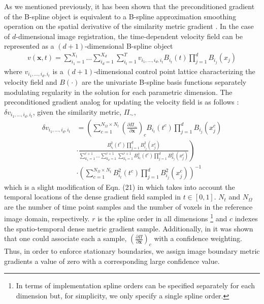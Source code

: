 \documentclass{frontiersSCNS}
\begin{document}
As we mentioned previously, it has been shown that the preconditioned
gradient of the B-spline object is equivalent to a B-spline approximation
smoothing operation on the spatial derivative of the similarity metric
gradient \citep{tustison2009}. In the case of
$d$-dimensional image registration, the time-dependent velocity field can be
represented
as a $(d + 1)$-dimensional B-spline object
\begin{align}
v(\mathbf{x}, t) = \sum_{i_1=1}^{X_1}\ldots\sum_{i_d=1}^{X_d}\sum_{i_t=1}^T v_{i_1,\ldots,i_d,i_t} B_{i_t}(t) \prod_{j=1}^d B_{i_j}(x_j)
\end{align}
where $v_{i_1,\ldots,i_d,i_t}$ is a $(d+1)$-dimensional control point lattice
characterizing the velocity field and $B(\cdot)$ are the univariate B-spline
basis functions separately modulating regularity in the solution for each parametric dimension.  The preconditioned gradient analog for updating the velocity
field is as follows \citep{tustison2012}:
$\delta v_{i_1,\ldots,i_d,i_t}$, given the similarity metric, $\Pi_\sim$,
\begin{align}
\label{eq:dmffd}
  \delta v_{i_1,\ldots,i_d,i_t} &= \left( \sum_{c=1}^{N_{\Omega} \times N_t} \left( \frac{\partial \Pi_\sim}{\partial \mathbf{x}} \right)_c B_{i_t}(t^c)\prod_{j=1}^d B_{i_j}(x_j^c)  \right. \nonumber \\
  &\cdot \left. \frac{B_{i_t}^2(t^c) \prod_{j=1}^d B_{i_j}^2 (x_j^c)}
  {\sum_{k_1=1}^{r+1}\ldots\sum_{k_d=1}^{r+1} \sum_{k_t=1}^{r+1} B_{k_t}^2(t^c)
  \prod_{j=1}^d B_{k_j}^2 (x_j^c)} \right) \nonumber \\
  &\cdot\left({\sum_{c=1}^{N_{\Omega}\times N_t}B_{i_t}^2(t^c) \prod_{j=1}^d B_{i_j}^2 (x_j^c)} \right) ^{-1}
\end{align}
which is a slight modification of Eqn. (21) in \cite{tustison2009}
which takes into account the temporal locations of the
dense gradient field sampled in $t \in [0,1]$. $N_t$ and $N_\Omega$ are the number
of time point samples and the number of voxels in the reference image domain, respectively.
$r$ is the spline order in all dimensions%
\footnote{
In terms of implementation spline orders can be specified separately for each dimension but, for simplicity,
we only specify a single spline order.
}
and $c$ indexes the spatio-temporal dense metric gradient sample.
Additionally, in \cite{tustison2006} it was shown that one could associate each
a sample, $\left( \frac{\partial \Pi}{\partial \mathbf{x}}\right)_c$ with a confidence
weighting.  Thus, in order to enforce stationary boundaries, we
assign image boundary metric gradients a value of zero with a corresponding
large confidence value.
\end{document}

